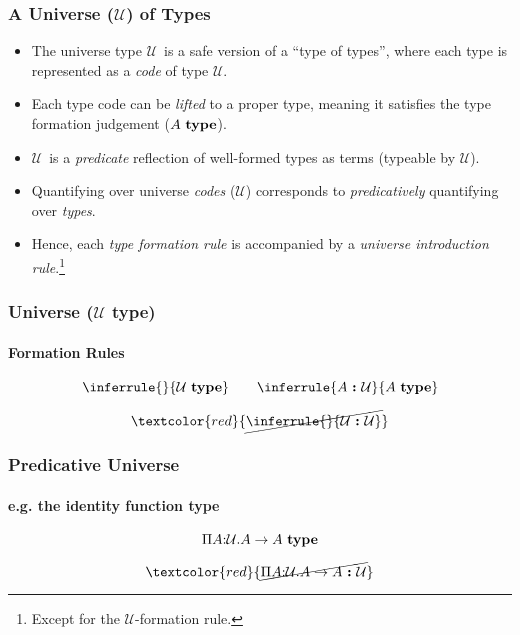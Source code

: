 \documentclass[mathserif]{beamer}
\newcommand{\bad}[1]{\textcolor{red}{\cancel{#1}}}
\newcommand{\istype}[1]{\ensuremath{#1 ~\textbf{\textrm{type}}}}
\newcommand{\isterm}[2]{\ensuremath{#1 ~\textbf{{:}}~ #2}}
\newcommand{\Arr}[2]{\ensuremath{#1 \rightarrow #2}}
\newcommand{\Funv}[3]{\ensuremath{\Pi #1{:}#2. #3}}
\newcommand{\Type}[0]{\ensuremath{\mathcal{U}}}
\begin{document}
\begin{frame}
\frametitle{A Universe (\Type) of Types}

\begin{itemize}

\item
The universe type \Type ~is a safe version of a ``type of types'',
where each type is represented as a \textit{code} of type \Type.

\item
Each type code can be \textit{lifted} to a proper type,
meaning it satisfies the type formation judgement (\istype{A}).

\item
\Type ~is a \textit{predicate} reflection of well-formed types
as terms (typeable by \Type).

\item
Quantifying over universe \textit{codes} (\Type) corresponds to
\textit{predicatively} quantifying over \textit{types}. 

\item
Hence, each \textit{type formation rule} is accompanied
by a \textit{universe introduction rule}.\footnote{
  Except for the \Type-formation rule.
  }

\end{itemize}

\end{frame}

\begin{frame}
\frametitle{Universe ($\Type$ type)}
\framesubtitle{Formation Rules}

$$
\inferrule{
  {}
}
{\istype{\Type}}
\qquad
\inferrule{
  {\isterm{A}{\Type}}
}
{\istype{A}}
$$

$$
\bad{\inferrule{
  {}
}
{\isterm{\Type}{\Type}}}
$$

\end{frame}

\begin{frame}
\frametitle{Predicative Universe}
\framesubtitle{e.g. the identity function type}

$$
\istype{\Funv{A}{\Type}{\Arr{A}{A}}}
$$

$$
\bad{\isterm{\Funv{A}{\Type}{\Arr{A}{A}}}{\Type}}
$$

\end{frame}
\end{document}
